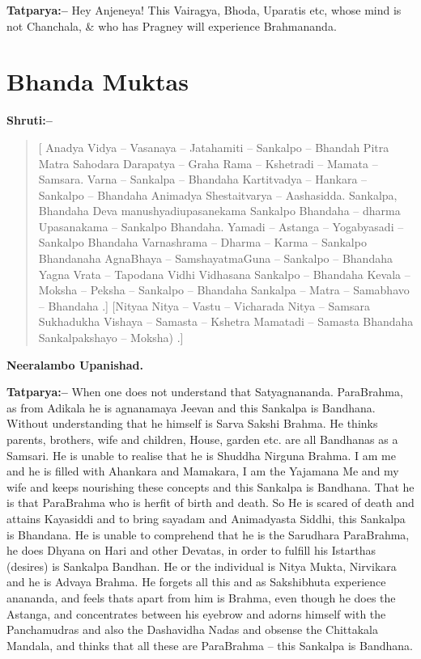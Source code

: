 \textbf{Tatparya:–} Hey Anjeneya! This Vairagya, Bhoda, Uparatis etc, whose mind is not Chanchala, \& who has Pragney will experience Brahmananda.

\chapter{Bhanda Muktas}

\textbf{Shruti:–}

\begin{verse}
[ Anadya Vidya – Vasanaya – Jatahamiti – Sankalpo – Bhandah  Pitra Matra Sahodara Darapatya – Graha Rama – Kshetradi – Mamata – Samsara. Varna – Sankalpa – Bhandaha  Kartitvadya – Hankara – Sankalpo – Bhandaha  Animadya Shestaitvarya – Aashasidda. Sankalpa, Bhandaha  Deva manushyadiupasanekama Sankalpo Bhandaha  – dharma Upasanakama – Sankalpo Bhandaha. Yamadi – Astanga – Yogabyasadi – Sankalpo Bhandaha  Varnashrama – Dharma – Karma – Sankalpo Bhandanaha  AgnaBhaya – SamshayatmaGuna – Sankalpo – Bhandaha  Yagna Vrata – Tapodana Vidhi Vidhasana Sankalpo – Bhandaha  Kevala – Moksha – Peksha – Sankalpo – Bhandaha  Sankalpa – Matra – Samabhavo – Bhandaha .] [Nityaa Nitya – Vastu – Vicharada Nitya – Samsara Sukhadukha Vishaya – Samasta – Kshetra Mamatadi – Samasta Bhandaha Sankalpakshayo – Moksha) .]
\end{verse}

\begin{flushright}
\textbf{Neeralambo Upanishad.}
\end{flushright}

\textbf{Tatparya:–} When one does not understand that Satyagnananda. ParaBrahma, as from Adikala he is agnanamaya Jeevan and this Sankalpa is Bandhana. Without understanding that he himself is Sarva Sakshi Brahma. He thinks parents, brothers, wife and children, House, garden etc. are all Bandhanas as a Samsari. He is unable to realise that he is Shuddha Nirguna Brahma. I am me and he is filled with Ahankara and Mamakara, I am the Yajamana Me and my wife and keeps nourishing these concepts and this Sankalpa is Bandhana. That he is that ParaBrahma who is herfit of birth and death. So He is scared of death and attains Kayasiddi and to bring sayadam and Animadyasta Siddhi, this Sankalpa is Bhandana. He is unable to comprehend that he is the Sarudhara ParaBrahma, he does Dhyana on Hari and other Devatas, in order to fulfill his Istarthas (desires) is Sankalpa Bandhan. He or the individual is Nitya Mukta, Nirvikara and he is Advaya Brahma. He forgets all this and as Sakshibhuta experience anananda, and feels thats apart from him is Brahma, even though he does the Astanga, and concentrates between his eyebrow and adorns himself with the Panchamudras and also the Dashavidha Nadas and obsense the Chittakala Mandala, and thinks that all these are ParaBrahma – this Sankalpa is Bandhana.

